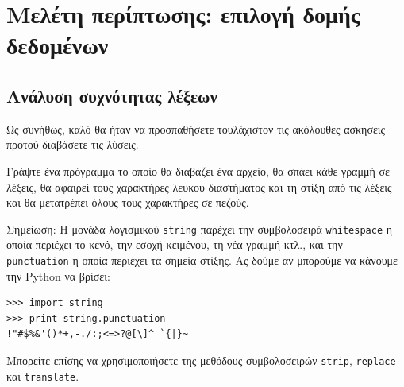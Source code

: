 \documentclass[10pt]{book}
\begin{document}

 


\chapter{Μελέτη περίπτωσης: επιλογή δομής δεδομένων}

\section{Ανάλυση συχνότητας λέξεων}
\label{analysis}

Ως συνήθως, καλό θα ήταν να προσπαθήσετε τουλάχιστον τις ακόλουθες ασκήσεις προτού διαβάσετε τις λύσεις.
\\
\begin{exercise}

Γράψτε ένα πρόγραμμα το οποίο θα διαβάζει ένα αρχείο, θα σπάει κάθε γραμμή σε λέξεις, θα αφαιρεί τους χαρακτήρες λευκού διαστήματος και τη στίξη από τις λέξεις και θα μετατρέπει όλους τους χαρακτήρες σε πεζούς.

Σημείωση: Η μονάδα λογισμικού {\tt string} παρέχει την συμβολοσειρά {\tt whitespace} η οποία περιέχει το κενό, την εσοχή κειμένου, τη νέα γραμμή κτλ., και την {\tt punctuation} η οποία περιέχει τα σημεία στίξης. Ας δούμε αν μπορούμε να κάνουμε την Python να βρίσει:

\begin{verbatim}
>>> import string
>>> print string.punctuation
!"#$%&'()*+,-./:;<=>?@[\]^_`{|}~
\end{verbatim}
%
Μπορείτε επίσης να χρησιμοποιήσετε της μεθόδους συμβολοσειρών {\tt strip}, {\tt replace} και {\tt translate}.
\\
\end{exercise}
\end{document}
